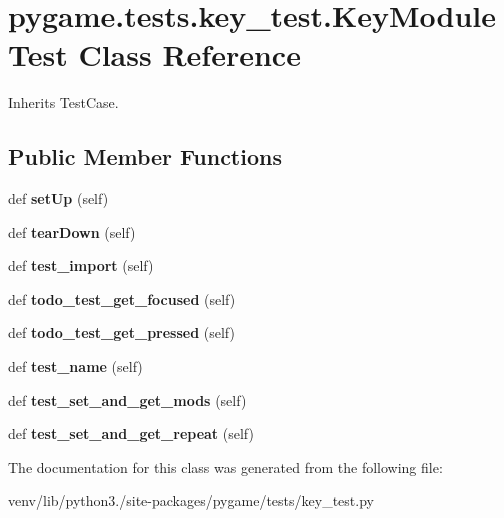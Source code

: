 \hypertarget{classpygame_1_1tests_1_1key__test_1_1_key_module_test}{}\section{pygame.\+tests.\+key\+\_\+test.\+Key\+Module\+Test Class Reference}
\label{classpygame_1_1tests_1_1key__test_1_1_key_module_test}


Inherits Test\+Case.

\subsection*{Public Member Functions}
\begin{DoxyCompactItemize}
\item 
\mbox{\label{classpygame_1_1tests_1_1key__test_1_1_key_module_test_a0b521c6ce3537cf19008f4fd156f73ec}} 
def {\bfseries set\+Up} (self)
\item 
\mbox{\label{classpygame_1_1tests_1_1key__test_1_1_key_module_test_a037963cc973b679ff43e27b9cd022f1e}} 
def {\bfseries tear\+Down} (self)
\item 
\mbox{\label{classpygame_1_1tests_1_1key__test_1_1_key_module_test_aab0cfb88a5c0734da84e3560edbc66ce}} 
def {\bfseries test\+\_\+import} (self)
\item 
\mbox{\label{classpygame_1_1tests_1_1key__test_1_1_key_module_test_a85dc84e1cf02585ef7295584e88a2894}} 
def {\bfseries todo\+\_\+test\+\_\+get\+\_\+focused} (self)
\item 
\mbox{\label{classpygame_1_1tests_1_1key__test_1_1_key_module_test_a0202a10477b91ab1d92fe03a953e04b9}} 
def {\bfseries todo\+\_\+test\+\_\+get\+\_\+pressed} (self)
\item 
\mbox{\label{classpygame_1_1tests_1_1key__test_1_1_key_module_test_a9b24fa76e6670834ff5a124bf21f53c5}} 
def {\bfseries test\+\_\+name} (self)
\item 
\mbox{\label{classpygame_1_1tests_1_1key__test_1_1_key_module_test_a6a7f4f21d0c652a2566d1b5aeb4bc907}} 
def {\bfseries test\+\_\+set\+\_\+and\+\_\+get\+\_\+mods} (self)
\item 
\mbox{\label{classpygame_1_1tests_1_1key__test_1_1_key_module_test_a81148ed3174e78e3d17ebbe2ce41c374}} 
def {\bfseries test\+\_\+set\+\_\+and\+\_\+get\+\_\+repeat} (self)
\end{DoxyCompactItemize}


The documentation for this class was generated from the following file\+:\begin{DoxyCompactItemize}
\item 
venv/lib/python3./site-\/packages/pygame/tests/key\+\_\+test.\+py\end{DoxyCompactItemize}
